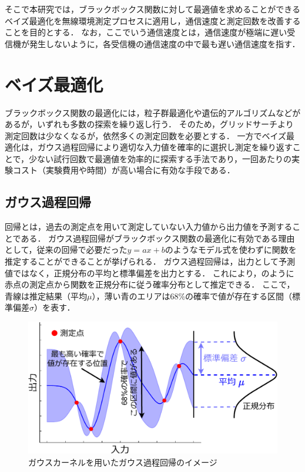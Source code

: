 \documentclass[twocolumn]{ltjarticle}
\begin{document}
そこで本研究では，ブラックボックス関数に対して最適値を求めることができるベイズ最適化を無線環境測定プロセスに適用し，通信速度と測定回数を改善することを目的とする．
なお，ここでいう通信速度とは，通信速度が極端に遅い受信機が発生しないように，各受信機の通信速度の中で最も遅い通信速度を指す．

\section{ベイズ最適化}

ブラックボックス関数の最適化には，粒子群最適化や遺伝的アルゴリズムなどがあるが，いずれも多数の探索を繰り返し行う．
そのため，グリッドサーチより測定回数は少なくなるが，依然多くの測定回数を必要とする．
一方でベイズ最適化は，ガウス過程回帰により適切な入力値を確率的に選択し測定を繰り返すことで，少ない試行回数で最適値を効率的に探索する手法であり，一回あたりの実験コスト（実験費用や時間）が高い場合に有効な手段である．

\subsection{ガウス過程回帰}

回帰とは，過去の測定点を用いて測定していない入力値から出力値を予測することである．
ガウス過程回帰がブラックボックス関数の最適化に有効である理由として，従来の回帰で必要だった\(y=ax+b\)のようなモデル式を使わずに関数を推定することができることが挙げられる．
ガウス過程回帰は，出力として予測値ではなく，正規分布の平均と標準偏差を出力とする．
これにより，のように赤点の測定点から関数を正規分布に従う確率分布として推定できる．
ここで，青線は推定結果（平均\(\mu\)），薄い青のエリアは68\%の確率で値が存在する区間（標準偏差\(\sigma\)）を表す．
\setlength\intextsep{3pt}
\setlength\textfloatsep{3pt}
\begin{figure}[htbp]
	\centering
	\includegraphics[width=0.9\linewidth]{./figures/material_5_kernel_v2.pdf}
	\vspace*{-0.3cm}
	\caption{ガウスカーネルを用いたガウス過程回帰のイメージ} \label{fig:gaussian_process}
\end{figure}
\end{document}
